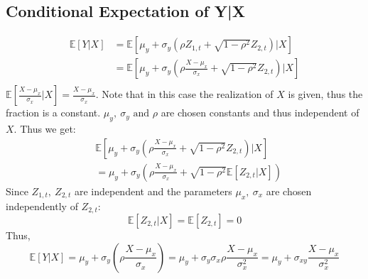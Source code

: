 \message{ !name(three_four.tex)}\documentclass[11pt]{article}
\begin{document}
\subsection{Conditional Expectation of Y|X}
\label{sec:cond-expect}
\begin{equation}
  \label{eq:11}
  \begin{split}
    \mathbb{E}[Y|X] &= \mathbb{E}[\mu_y + \sigma_y (\rho Z_{1,t} + \sqrt{1-\rho^2} Z_{2,t})|X]\\
    &= \mathbb{E}[\mu_y + \sigma_y (\rho \frac{X-\mu_x}{\sigma_x} + \sqrt{1-\rho^2} Z_{2,t})|X]\\
  \end{split}
\end{equation}
$\mathbb{E}[\frac{X-\mu_x}{\sigma_x}|X] = \frac{X-\mu_x}{\sigma_x}$. Note that in this case the realization of $X$ is given, thus the fraction is a constant. $\mu_y,\ \sigma_y \text{ and } \rho$ are chosen constants and thus independent of $X$. Thus we get:
\begin{equation}
  \label{eq:12}
  \begin{split}
    &\mathbb{E}[\mu_y + \sigma_y (\rho \frac{X-\mu_x}{\sigma_x} + \sqrt{1-\rho^2} Z_{2,t})|X]\\
    & = \mu_y + \sigma_y (\rho \frac{X-\mu_x}{\sigma_x} + \sqrt{1-\rho^2} \mathbb{E} [Z_{2,t}|X])
  \end{split}
\end{equation}
Since $Z_{1,t},\ Z_{2,t}$ are independent and the parameters $\mu_x,\ \sigma_x$ are chosen independently of $Z_{2,t}$:
\begin{equation}
  \label{eq:13}
  \mathbb{E}[Z_{2,t}|X]= \mathbb{E}[Z_{2,t}] = 0
\end{equation}
Thus,
\begin{equation}
  \label{eq:15}
  \mathbb{E}[Y|X] = \mu_y + \sigma_y (\rho \frac{X-\mu_x}{\sigma_x}) = \mu_y + \sigma_y \sigma_x \rho \frac{X-\mu_x}{\sigma_x^2} = \mu_y + \sigma_{xy}\frac{X-\mu_x}{\sigma_x^2}
\end{equation}
\end{document}
